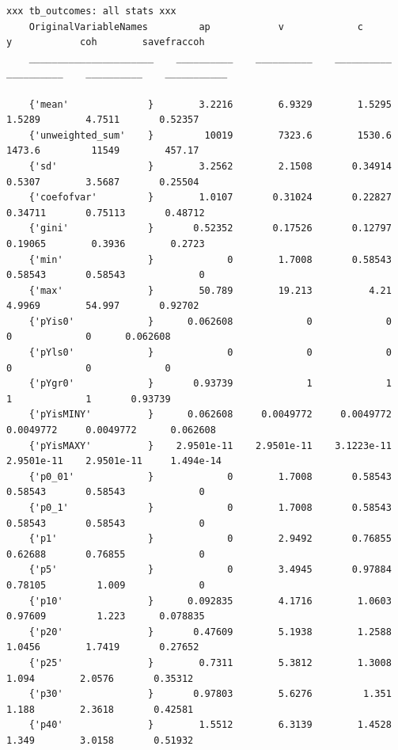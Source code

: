 \documentclass[
]{book}
\begin{document}
\begin{verbatim}
xxx tb_outcomes: all stats xxx
    OriginalVariableNames         ap            v             c             y            coh        savefraccoh
    ______________________    __________    __________    __________    __________    __________    ___________

    {'mean'              }        3.2216        6.9329        1.5295        1.5289        4.7511       0.52357 
    {'unweighted_sum'    }         10019        7323.6        1530.6        1473.6         11549        457.17 
    {'sd'                }        3.2562        2.1508       0.34914        0.5307        3.5687       0.25504 
    {'coefofvar'         }        1.0107       0.31024       0.22827       0.34711       0.75113       0.48712 
    {'gini'              }       0.52352       0.17526       0.12797       0.19065        0.3936        0.2723 
    {'min'               }             0        1.7008       0.58543       0.58543       0.58543             0 
    {'max'               }        50.789        19.213          4.21        4.9969        54.997       0.92702 
    {'pYis0'             }      0.062608             0             0             0             0      0.062608 
    {'pYls0'             }             0             0             0             0             0             0 
    {'pYgr0'             }       0.93739             1             1             1             1       0.93739 
    {'pYisMINY'          }      0.062608     0.0049772     0.0049772     0.0049772     0.0049772      0.062608 
    {'pYisMAXY'          }    2.9501e-11    2.9501e-11    3.1223e-11    2.9501e-11    2.9501e-11     1.494e-14 
    {'p0_01'             }             0        1.7008       0.58543       0.58543       0.58543             0 
    {'p0_1'              }             0        1.7008       0.58543       0.58543       0.58543             0 
    {'p1'                }             0        2.9492       0.76855       0.62688       0.76855             0 
    {'p5'                }             0        3.4945       0.97884       0.78105         1.009             0 
    {'p10'               }      0.092835        4.1716        1.0603       0.97609         1.223      0.078835 
    {'p20'               }       0.47609        5.1938        1.2588        1.0456        1.7419       0.27652 
    {'p25'               }        0.7311        5.3812        1.3008         1.094        2.0576       0.35312 
    {'p30'               }       0.97803        5.6276         1.351         1.188        2.3618       0.42581 
    {'p40'               }        1.5512        6.3139        1.4528         1.349        3.0158       0.51932 

\end{verbatim}
\end{document}
